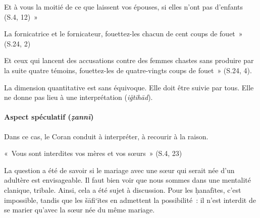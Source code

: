 \begin{Ex}
Et à vous la moitié de ce que laissent vos
épouses, si elles n'ont pas d'enfants (S.4, 12)~»

\end{Ex}

\begin{Ex}
La fornicatrice et le fornicateur, fouettez-les
chacun de cent coups de fouet~» (S.24, 2)

\end{Ex}

\begin{Ex}
Et ceux qui lancent des accusations contre des
femmes chastes sans produire par la suite quatre témoins, fouettez-les
de quatre-vingts coups de fouet~» (S.24, 4).

\end{Ex}
 

La dimension quantitative est sans équivoque. Elle doit être suivie par
tous. Elle ne donne pas lieu à une interprétation (\emph{iğtihād}).

 
\paragraph{{Aspect spéculatif
(\emph{ẓannī})}}

Dans ce cas, le Coran conduit à interpréter, à recourir à la raison.
\begin{Ex}
«~Vous sont interdites vos mères et vos sœurs~» (S.4,
23)



La question a été de savoir si le mariage avec une sœur qui serait née
d'un adultère est envisageable. Il faut bien voir que nous sommes dans
une mentalité clanique, tribale. Ainsi, cela a été sujet à discussion.
Pour les ḥanafītes, c'est impossible, tandis que les šāfi`ītes en
admettent la possibilité~: il n'est interdit de se marier qu'avec la
sœur née du même mariage.
\end{Ex}
 

